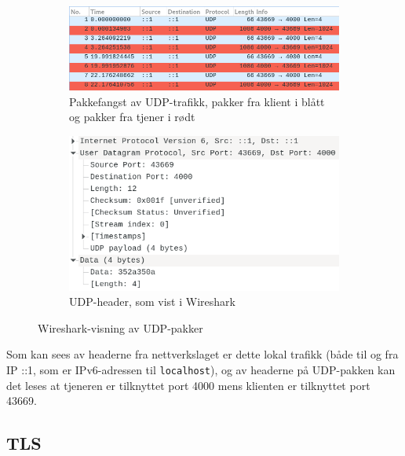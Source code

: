 \documentclass{article}
\begin{document}
\begin{figure}[h]
    \centering
    \begin{subfigure}{.45\linewidth}
        \centering
        \includegraphics[width=\linewidth]{illustrasjoner/P4-UDP-capture.png}
        \caption[short]{Pakkefangst av UDP-trafikk, pakker fra klient i blått og pakker fra tjener i rødt}
    \end{subfigure}
    \hfill
    \begin{subfigure}{.45\linewidth}
        \centering
        \includegraphics[width=\linewidth]{illustrasjoner/P4-UDP-header.png}
        \caption[short]{UDP-header, som vist i Wireshark}
    \end{subfigure}
    \caption{Wireshark-visning av UDP-pakker}
\end{figure}

Som kan sees av headerne fra nettverkslaget er dette lokal trafikk (både til og fra IP ::1, som er IPv6-adressen til \texttt{localhost}), og av headerne på UDP-pakken kan det leses at tjeneren er tilknyttet port 4000 mens klienten er tilknyttet port 43669.

\subsection{TLS}
\end{document}

